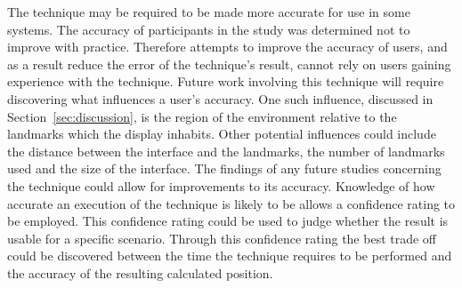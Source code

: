 \documentclass{bmcart}
\begin{document}
The technique may be required to be made more accurate for use in some systems.
The accuracy of participants in the study was determined not to improve with practice.
Therefore attempts to improve the accuracy of users, and as a result reduce the error of the technique's result, cannot rely on users gaining experience with the technique.
Future work involving this technique will require discovering what influences a user's accuracy.
One such influence, discussed in Section~\ref{sec:discussion}, is the region of the environment relative to the landmarks which the display inhabits.
Other potential influences could include the distance between the interface and the landmarks, the number of landmarks used and the size of the interface.
The findings of any future studies concerning the technique could allow for improvements to its accuracy.
Knowledge of how accurate an execution of the technique is likely to be allows a confidence rating to be employed.
This confidence rating could be used to judge whether the result is usable for a specific scenario.
Through this confidence rating the best trade off could be discovered between the time the technique requires to be performed and the accuracy of the resulting calculated position.


\end{document}
